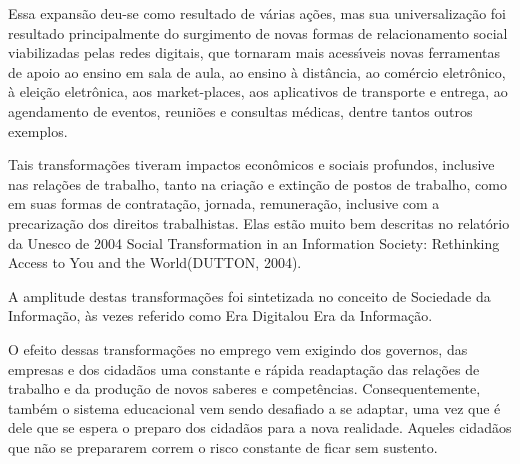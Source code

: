 \documentclass[
12pt,		%
openright,	%
twoside,  %
a4paper,			%
chapter=TITLE,		%
english,			%
french,				%
spanish,			%
brazil				%
]{USPSC-classe/USPSC}
\begin{document}
Essa expans\~ao deu-se como resultado de v\'arias a\c{c}\~oes, mas sua universaliza\c{c}\~ao foi resultado principalmente do surgimento de novas formas de relacionamento social viabilizadas pelas redes digitais, que tornaram mais acess\'{\i}veis novas ferramentas de apoio ao ensino em sala de aula, ao ensino \`a dist\^ancia, ao com\'ercio eletr\^onico, \`a elei\c{c}\~ao eletr\^onica, aos \textquotedbl market-places\textquotedbl , aos aplicativos de transporte e entrega, ao agendamento de eventos, reuni\~oes e consultas m\'edicas, dentre tantos outros exemplos.

















Tais transforma\c{c}\~oes tiveram impactos econ\^omicos e sociais profundos, inclusive nas rela\c{c}\~oes de trabalho, tanto na cria\c{c}\~ao e extin\c{c}\~ao de postos de trabalho, como em suas formas de contrata\c{c}\~ao, jornada, remunera\c{c}\~ao, inclusive com a precariza\c{c}\~ao dos direitos trabalhistas. Elas est\~ao muito bem descritas  no relat\'orio da Unesco  de 2004 \textquotedbl Social Transformation in an Information Society: Rethinking Access to You and the World\textquotedbl  (DUTTON, 2004).

















A amplitude destas transforma\c{c}\~oes foi sintetizada no conceito de \textquotedbl Sociedade da Informa\c{c}\~ao\textquotedbl , \`as vezes referido como \textquotedbl Era Digital\textquotedbl  ou \textquotedbl Era da Informa\c{c}\~ao\textquotedbl .

















O efeito dessas transforma\c{c}\~oes no emprego vem exigindo dos governos, das empresas e dos cidad\~aos uma constante e r\'apida readapta\c{c}\~ao  das rela\c{c}\~oes de trabalho e da produ\c{c}\~ao de novos saberes e compet\^encias. Consequentemente, tamb\'em o sistema educacional vem sendo desafiado a se adaptar, uma vez que \'e dele que se espera o preparo dos cidad\~aos para a nova realidade. Aqueles cidad\~aos que n\~ao se prepararem correm o risco constante de ficar sem sustento.
\end{document}
